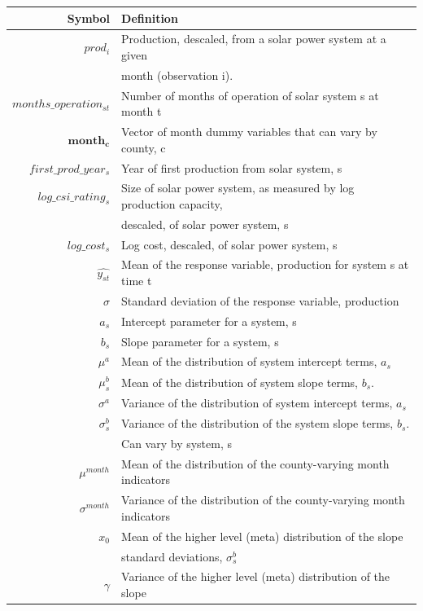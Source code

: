 \documentclass[a4paper]{article}
\begin{document}
\begin{table}
  \begin{tabular}{rl}
  \toprule
    Symbol &  Definition \\
    \midrule
    $prod_{i}$ & Production, descaled, from a solar power system at a given \\
    &month (observation i).\\
    $months\_operation_{st}$ & Number of months of operation of solar system s at month t \\
    $\mathbf{month_c}$ & Vector of month dummy variables that can vary by county, c\\
    $first\_prod\_year_s$ & Year of first production from solar system, s\\
    $log\_csi\_rating_s$ & Size of solar power system, as measured by log production capacity, \\
    &descaled, of solar power system, s\\
    $log\_cost_s$ & Log cost, descaled, of solar power system, s \\
    $\hat{y_{st}}$ & Mean of the response variable, production for system s at time t\\
    $\sigma$ & Standard deviation of the response variable, production \\
    $a_s$& Intercept parameter for a system, s \\
    $b_s$ & Slope parameter for a system, s \\
    $\mu^a$ & Mean of the distribution of system intercept terms, $a_s$ \\
    $\mu^b_s$ & Mean of the distribution of system slope terms, $b_s$.  \\
    $\sigma^{a}$ & Variance of the distribution of system intercept terms, $a_s$\\
    $\sigma^{b}_s$ & Variance of the distribution of the system slope terms, $b_s$. \\
    & Can vary by system, s \\
    $\mu^{month}$ & Mean of the distribution of the county-varying month indicators\\
    $\sigma^{month}$ & Variance of the distribution of the county-varying month indicators\\
    $x_0$ & Mean of the higher level (meta) distribution of the slope \\
    & standard deviations, $\sigma^b_s$\\
    $\gamma$ &  Variance of the higher level (meta) distribution of the slope \\

\end{tabular}
\end{table}
\end{document}
